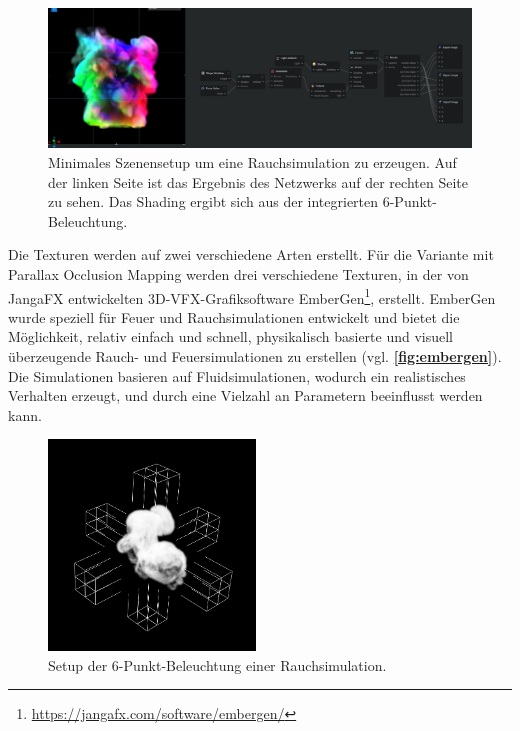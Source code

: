 \begin{figure}[h!]
	\includegraphics[width=\textwidth]{Grafiken/Implementation/embergen.png}
	\centering
	\begin{footnotesize}
		\caption{Minimales Szenensetup um eine Rauchsimulation zu erzeugen. Auf der linken Seite ist das Ergebnis des Netzwerks auf der rechten Seite zu sehen. Das Shading ergibt sich aus der
			integrierten 6-Punkt-Beleuchtung.}
		\label{fig:embergen}
	\end{footnotesize}
\end{figure}

Die Texturen werden auf zwei verschiedene Arten erstellt. Für die Variante mit Parallax Occlusion Mapping werden drei verschiedene
Texturen, in der von JangaFX entwickelten 3D-VFX-Grafiksoftware EmberGen\footnote{\url{https://jangafx.com/software/embergen/}}, erstellt.
EmberGen wurde speziell für Feuer und Rauchsimulationen entwickelt und bietet die Möglichkeit, relativ einfach und schnell, physikalisch basierte und visuell
überzeugende Rauch- und Feuersimulationen zu erstellen (vgl. \textbf{\autoref{fig:embergen}}).
Die Simulationen basieren auf Fluidsimulationen, wodurch ein realistisches Verhalten erzeugt, und durch eine Vielzahl an Parametern beeinflusst werden kann.

\begin{figure}[h!b]
	\includegraphics[width=0.49\textwidth]{Grafiken/Implementation/Lightmaps/Smoke_LightSetup.png}
	\centering
	\begin{footnotesize}
		\caption{Setup der 6-Punkt-Beleuchtung einer Rauchsimulation.}
		\label{fig:lightSetup}
	\end{footnotesize}
\end{figure}

